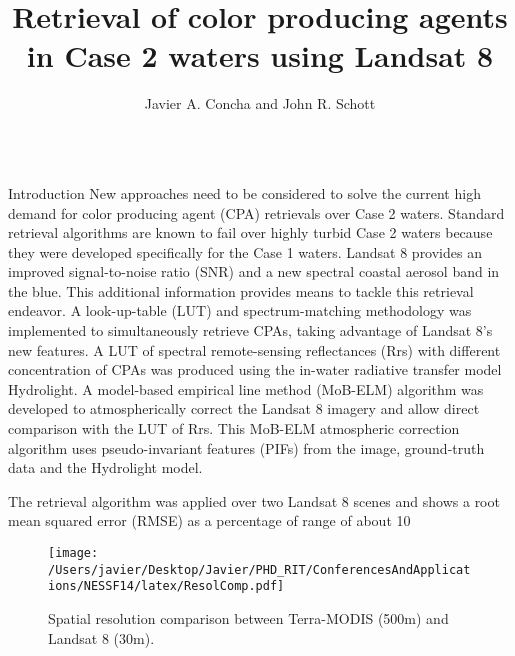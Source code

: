 \documentclass[mathserif]{beamer}
\title{ \huge Retrieval of color producing agents in Case 2 waters using Landsat 8}
\author[]{Javier A. Concha and John R. Schott}
\institute[Rochester Institute of Technology]{Digital Imaging and Remote Sensing Laboratory, Chester F. Carlson Center for Imaging Science\\ Rochester Institute of Technology, Rochester, New York, USA}
\begin{document}
\begin{frame}{} 
  \begin{columns}[t]
    

\begin{column}{.3\linewidth}
\begin{block}{Introduction}
\justifying\small New approaches need to be considered to solve the current high demand for color producing agent (CPA) retrievals over Case 2 waters. Standard retrieval algorithms are known to fail over highly turbid Case 2 waters because they were developed specifically for the Case 1 waters. Landsat 8 provides an improved signal-to-noise ratio (SNR) and a new spectral coastal aerosol band in the blue. This additional information provides means to tackle this retrieval endeavor. A look-up-table (LUT) and spectrum-matching methodology was implemented to simultaneously retrieve CPAs, taking advantage of Landsat 8's new features. A LUT of spectral remote-sensing reflectances (Rrs) with different concentration of CPAs was produced using the in-water radiative transfer model Hydrolight. A model-based empirical line method (MoB-ELM) algorithm was developed to atmospherically correct the Landsat 8 imagery and allow direct comparison with the LUT of Rrs. This MoB-ELM atmospheric correction algorithm uses pseudo-invariant features (PIFs) from the image, ground-truth data and the Hydrolight model.

The retrieval algorithm was applied over two Landsat 8 scenes and shows a root mean squared error (RMSE) as a percentage of range of about 10%
\\
\begin{center}
\begin{figure}[H]
\centering
  \texttt{[image: /Users/javier/Desktop/Javier/PHD\_RIT/ConferencesAndApplications/NESSF14/latex/ResolComp.pdf]}
  \caption{Spatial resolution comparison between Terra-MODIS (500m) and Landsat 8 (30m). \label{fig:resol} } 
\end{figure}
\end{center}
\end{block}
      

\end{column}
\end{columns}
\end{frame}
\end{document}
